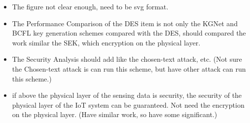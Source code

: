 \documentclass[a4paper]{article}
\begin{document}
\begin{itemize}
  \item The figure not clear enough, need to be svg format.
  \item The Performance Comparison of the DES item is not only the KGNet and BCFL key generation schemes compared with the DES, should compared the work similar the SEK, which encryption on the physical layer.
  \item The Security Analysis should add like the chosen-text attack, etc. (Not sure the Chosen-text attack is can run this scheme, but have other attack can run this scheme.)
  \item if above the physical layer of the sensing data is security, the security of the physical layer of the IoT system can be guaranteed. Not need the encryption on the physical layer. (Have similar work, so have some significant.)
\end{itemize}

% 
\end{document}
